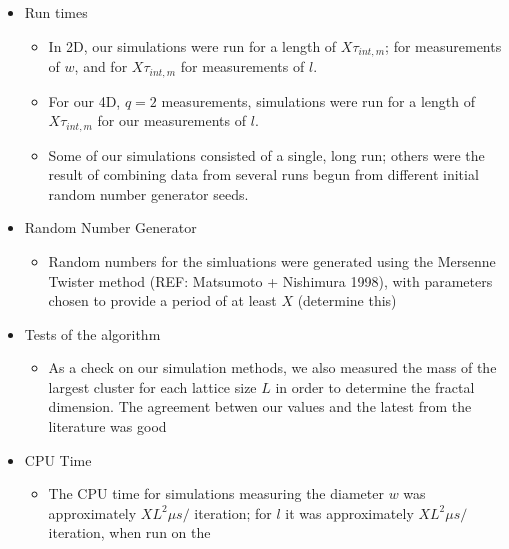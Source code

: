 \documentclass[11pt]{article}
\begin{document}
\begin{itemize}
\item Run times
\label{sec-5-2-5-4}%
\begin{itemize}

\item In 2D, our simulations were run for a length of $X \tau_{int,m}$; for measurements of $w$, and for $X  \tau_{int,m}$ for measurements of $l$.\\
\label{sec-5-2-5-4-1}%
\item For our 4D, $q=2$ measurements, simulations were run for a length of $X \tau_{int,m}$ for our measurements of $l$.\\
\label{sec-5-2-5-4-2}%
\item Some of our simulations consisted of a single, long run; others were the result of combining data from several runs begun from different initial random number generator seeds.\\
\label{sec-5-2-5-4-3}%
\end{itemize} %

\item Random Number Generator
\label{sec-5-2-5-5}%
\begin{itemize}

\item Random numbers for the simluations were generated using the Mersenne Twister method (REF:  Matsumoto + Nishimura 1998), with parameters chosen to provide a period of at least $X$ (determine this)\\
\label{sec-5-2-5-5-1}%
\end{itemize} %

\item Tests of the algorithm
\label{sec-5-2-5-6}%
\begin{itemize}

\item As a check on our simulation methods, we also measured the mass of the largest cluster for each lattice size $L$ in order to determine the fractal dimension.  The agreement betwen our values and the latest from the literature was good\\
\label{sec-5-2-5-6-1}%
\end{itemize} %

\item CPU Time
\label{sec-5-2-5-7}%
\begin{itemize}

\item The CPU time for simulations measuring the diameter $w$ was approximately $X L^2 \mu s /$ iteration; for $l$ it was approximately $X L^2 \mu s /$ iteration, when run on the\\
\label{sec-5-2-5-7-1}%
\end{itemize} %


\end{itemize}
\end{document}
